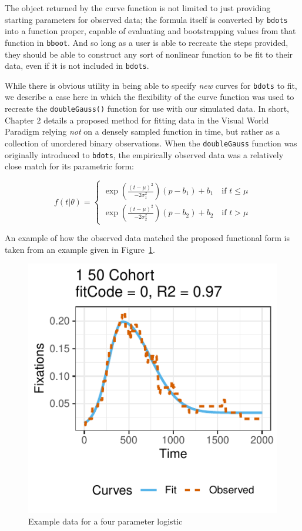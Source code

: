 \documentclass{article}
\newcommand{\xt}{\texttt}%
\begin{document}
The object returned by the curve function is not limited to just providing starting parameters for observed data; the formula itself is converted by \xt{bdots} into a function proper, capable of evaluating and bootstrapping values from that function in \xt{bboot}. And so long as a user is able to recreate the steps provided, they should be able to construct any sort of nonlinear function to be fit to their data, even if it is not included in \xt{bdots}.

While there is obvious utility in being able to specify \textit{new} curves for \xt{bdots} to fit, we describe a case here in which the flexibility of the curve function was used to recreate the \xt{doubleGauss()} function for use with our simulated data. In short, Chapter 2 details a proposed method for fitting data in the Visual World Paradigm relying \textit{not} on a densely sampled function in time, but rather as a collection of unordered binary observations. When the \xt{doubleGauss} function was originally introduced to \xt{bdots}, the empirically observed data was a relatively close match for its parametric form:

\begin{equation}
f(t|\theta) = \begin{cases}
\exp \left( \frac{(t - \mu)^2}{-2\sigma_1^2} \right) (p - b_1) + b_1 \quad \text{if } t \leq \mu \\
\exp \left( \frac{(t - \mu)^2}{-2\sigma_2^2} \right) (p - b_2) + b_2 \quad \text{if } t > \mu
\end{cases}
\end{equation}

An example of how the observed data matched the proposed functional form is taken from an example given in Figure~\ref{fig:bdots_log}.

\begin{figure}[H]
\centering
\includegraphics[scale=1]{img/bdots_logistic.pdf}
\caption{Example data for a four parameter logistic}
\label{fig:bdots_log}
\end{figure}
\end{document}
